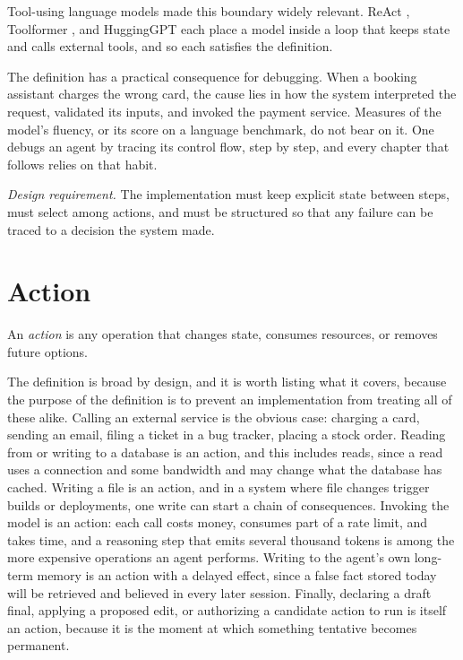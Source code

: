 \documentclass[11pt]{book}
\begin{document}
Tool-using language models made this boundary widely relevant. ReAct \cite{yao2022react}, Toolformer \cite{schick2023toolformer}, and HuggingGPT \cite{shen2023hugginggpt} each place a model inside a loop that keeps state and calls external tools, and so each satisfies the definition.

The definition has a practical consequence for debugging. When a booking assistant charges the wrong card, the cause lies in how the system interpreted the request, validated its inputs, and invoked the payment service. Measures of the model's fluency, or its score on a language benchmark, do not bear on it. One debugs an agent by tracing its control flow, step by step, and every chapter that follows relies on that habit.

\textit{Design requirement.} The implementation must keep explicit state between steps, must select among actions, and must be structured so that any failure can be traced to a decision the system made.

\section{Action}

An \emph{action} is any operation that changes state, consumes resources, or removes future options.

The definition is broad by design, and it is worth listing what it covers, because the purpose of the definition is to prevent an implementation from treating all of these alike. Calling an external service is the obvious case: charging a card, sending an email, filing a ticket in a bug tracker, placing a stock order. Reading from or writing to a database is an action, and this includes reads, since a read uses a connection and some bandwidth and may change what the database has cached. Writing a file is an action, and in a system where file changes trigger builds or deployments, one write can start a chain of consequences. Invoking the model is an action: each call costs money, consumes part of a rate limit, and takes time, and a reasoning step that emits several thousand tokens is among the more expensive operations an agent performs. Writing to the agent's own long-term memory is an action with a delayed effect, since a false fact stored today will be retrieved and believed in every later session. Finally, declaring a draft final, applying a proposed edit, or authorizing a candidate action to run is itself an action, because it is the moment at which something tentative becomes permanent.
\end{document}
